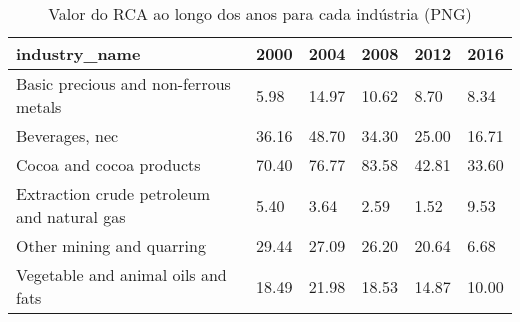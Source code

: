\begin{table}
\centering
\caption{Valor do RCA ao longo dos anos para cada indústria (PNG)}
\begin{tabular}{p{6cm}p{1.5cm}p{1.5cm}p{1.5cm}p{1.5cm}p{1.5cm}}
\toprule
                             industry\_name &  2000 &  2004 &  2008 &  2012 &  2016 \\
\midrule
     Basic precious and non-ferrous metals &  5.98 & 14.97 & 10.62 &  8.70 &  8.34 \\
                            Beverages, nec & 36.16 & 48.70 & 34.30 & 25.00 & 16.71 \\
                  Cocoa and cocoa products & 70.40 & 76.77 & 83.58 & 42.81 & 33.60 \\
Extraction crude petroleum and natural gas &  5.40 &  3.64 &  2.59 &  1.52 &  9.53 \\
                 Other mining and quarring & 29.44 & 27.09 & 26.20 & 20.64 &  6.68 \\
        Vegetable and animal oils and fats & 18.49 & 21.98 & 18.53 & 14.87 & 10.00 \\
\bottomrule
\end{tabular}
\end{table}
